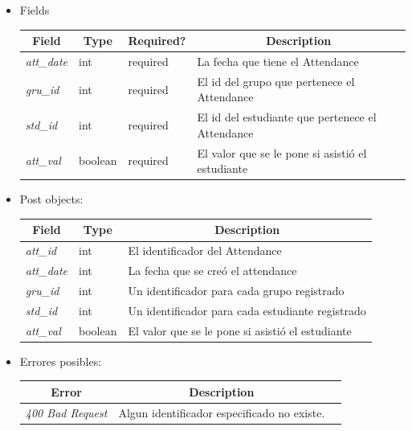\documentclass{article}
\begin{document}
\begin{enumerate}[i.]
\begin{itemize}
        \item Fields
        \begin{table}[H] \centering \begin{tabular}{|l|l|l|l|} \hline
        \multicolumn{1}{|c|}{\textbf{Field}} &
        \multicolumn{1}{c|}{\textbf{Type}} &
        \multicolumn{1}{c|}{\textbf{Required?}} &
        \multicolumn{1}{c|}{\textbf{Description}} \\ \hline \textit{att\_date} &
        int & required & La fecha que tiene el Attendance \\ \hline
        \textit{gru\_id} & int & required & El id del grupo que pertenece el
        Attendance \\ \hline \textit{std\_id} & int & required & El id del
        estudiante que pertenece el Attendance \\ \hline \textit{att\_val} &
        boolean & required & El valor que se le pone si asistió el estudiante \\
        \hline \end{tabular} \end{table}
        \item Post objects:
        \begin{table}[H] \centering \begin{tabular}{|l|l|l|} \hline
        \multicolumn{1}{|c|}{\textbf{Field}} &
        \multicolumn{1}{c|}{\textbf{Type}} &
        \multicolumn{1}{c|}{\textbf{Description}} \\ \hline \textit{att\_id} &
        int & El identificador del Attendance \\ \hline \textit{att\_date} & int
        & La fecha que se creó el attendance \\ \hline \textit{gru\_id} & int &
        Un identificador para cada grupo registrado \\ \hline \textit{std\_id} &
        int & Un identificador para cada estudiante registrado \\ \hline
        \textit{att\_val} & boolean & El valor que se le pone si asistió el
        estudiante \\ \hline \end{tabular} \end{table}
        \item Errores posibles:
        \begin{table}[H] \centering \begin{tabular}{|c|c|l|} \hline \textbf{Error} &
        \textbf{Description} \\ \hline \textit{400 Bad Request} & Algun identificador
        especificado no existe. \\ \hline \end{tabular} \end{table}
        

\end{itemize}
\end{enumerate}
\end{document}
